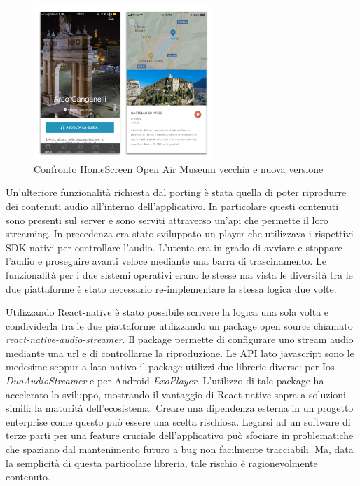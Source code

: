 \begin{figure}[h]
\centering
\includegraphics[width=0.6\textwidth]{images/audio.png}
\caption{Confronto HomeScreen Open Air Museum vecchia e nuova versione}
\end{figure}

Un'ulteriore funzionalità richiesta dal porting è stata quella di poter riprodurre dei contenuti audio all’interno dell’applicativo. In particolare questi contenuti sono presenti sul server e sono serviti attraverso un'api che permette il loro streaming. In precedenza era stato sviluppato un player che utilizzava i rispettivi SDK nativi per controllare l’audio. L'utente era in grado di avviare e stoppare l’audio e proseguire avanti veloce mediante una barra di trascinamento. Le funzionalità per i due sistemi operativi erano le stesse ma vista le diversità tra le due piattaforme è stato necessario re-implementare la stessa logica due volte.\vspace{2mm}

Utilizzando React-native è stato possibile scrivere la logica una sola volta e condividerla tra le due piattaforme utilizzando un package open source chiamato \emph{react-native-audio-streamer}. Il package permette di configurare uno stream audio mediante una url e di controllarne la riproduzione. Le API lato javascript sono le medesime seppur a lato nativo il package utilizzi due librerie diverse: per Ios \emph{DuoAudioStreamer} e per Android \emph{ExoPlayer}. L’utilizzo di tale package ha accelerato lo sviluppo, mostrando il vantaggio di React-native sopra a soluzioni simili: la maturità dell'ecosistema. Creare una dipendenza esterna in un progetto enterprise come questo può essere una scelta rischiosa. Legarsi ad un software di terze parti per una feature cruciale dell’applicativo può sfociare in problematiche che spaziano dal mantenimento futuro a bug non facilmente tracciabili. Ma, data la semplicità di questa particolare libreria, tale rischio è ragionevolmente contenuto.\vspace{2mm}

